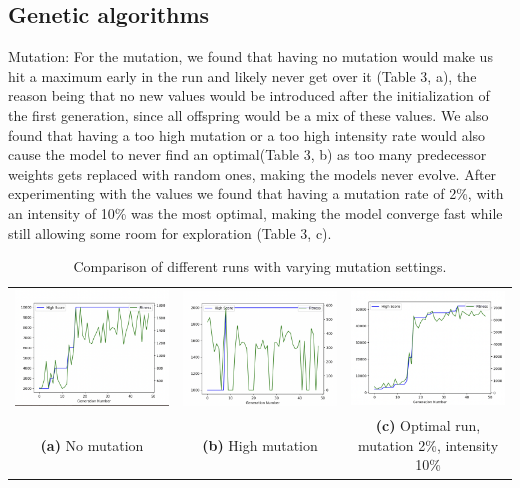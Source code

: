 \documentclass{article}
\begin{document}
\subsection{Genetic algorithms\label{gafindings}}

Mutation:
For the mutation, we found that having no mutation would make us hit a maximum early in the run and likely never get over it (Table 3, a), the reason being that no new values would be introduced after the initialization of the first generation, since all offspring would be a mix of these values. 
We also found that having a too high mutation or a too high intensity rate would also cause the model to never find an optimal(Table 3, b) as too many predecessor weights gets replaced with random ones, making the models never evolve.
After experimenting with the values we found that having a mutation rate of 2\%, with an intensity of 10\% was the most optimal, making the model converge fast while still allowing some room for exploration (Table 3, c).
\begin{table}[h!]
    \centering
    \begin{tabular}{ccc} %
        \includegraphics[width=0.3\linewidth]{no-mutation.png} &
        \includegraphics[width=0.3\linewidth]{high_mutation.png} &
        \includegraphics[width=0.3\linewidth]{optimal-settings.png} \\
        \textbf{(a)} No mutation & 
        \textbf{(b)} High mutation  & 
        \textbf{(c)} Optimal run, mutation 2\%, intensity 10\% \\
    \end{tabular}
    \caption{Comparison of different runs with varying mutation settings.}
    \label{tab:my_label}
\end{table}
\end{document}

